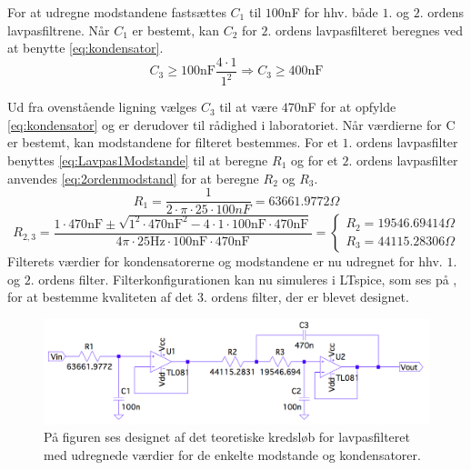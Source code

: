 \noindent For at udregne modstandene fastsættes $C_1$ til $100$nF for hhv. både $1$. og $2$. ordens lavpasfiltrene. Når $C_1$ er bestemt, kan $C_2$ for $2$. ordens lavpasfilteret beregnes ved at benytte \eqref{eq:kondensator}. %
\begin{equation}  
C_3 \geq 100\text{nF} \frac{4\cdot 1}{1^2} \Rightarrow C_3 \geq 400\text{nF}
\end{equation}

\noindent Ud fra ovenstående ligning vælges $C_3$ til at være $470$nF for at opfylde \eqref{eq:kondensator} og er derudover til rådighed i laboratoriet. Når værdierne for C er bestemt, kan modstandene for filteret bestemmes. For et $1$. ordens lavpasfilter benyttes \eqref{eq:Lavpas1Modstande} til at beregne $R_1$ og for et $2$. ordens lavpasfilter anvendes \eqref{eq:2ordenmodstand} for at beregne $R_2$ og $R_3$. 
\begin{equation} \label{eq:1ordenmodstand}
R_{1} = \frac{1}{2 \cdot \pi \cdot 25 \cdot 100nF} = 63661.9772 \Omega
\end{equation}
\begin{equation}
\label{eq:2ordenmodstand}R_{2,3} = \frac{1 \cdot 470\text{nF} \pm \sqrt{1^2 \cdot 470\text{nF}^2 - 4 \cdot 1 \cdot 100\text{nF} \cdot 470\text{nF}}}{4 \pi \cdot 25\text{Hz} \cdot 100\text{nF} \cdot 470\text{nF}} = \begin{cases} R_{2} = 19546.69414 \Omega \\ R_{3} =  44115.28306 \Omega \end{cases}
\end{equation}
\noindent Filterets værdier for kondensatorerne og modstandene er nu udregnet for hhv. $1$. og $2$. ordens filter. Filterkonfigurationen kan nu simuleres i LTspice, som ses på , for at bestemme kvaliteten af det $3$. ordens filter, der er blevet designet.

\begin{figure}[H]
	\centering
	\includegraphics[scale=0.35]{figures/cProblemloesning/Lavpasfilter1_LTspice.PNG}
	\caption{På figuren ses designet af det teoretiske kredsløb for lavpasfilteret med udregnede værdier for de enkelte modstande og kondensatorer.}
	\label{fig:lavpasfilter1_LTspice}
\end{figure}

